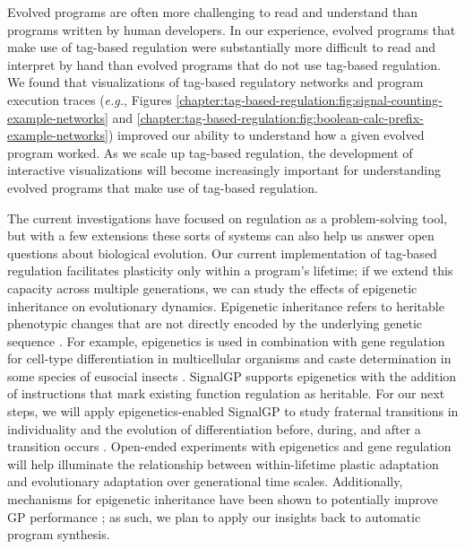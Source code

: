 Evolved programs are often more challenging to read and understand than programs written by human developers.
In our experience, evolved programs that make use of tag-based regulation were substantially more difficult to read and interpret by hand than evolved programs that do not use tag-based regulation.
We found that visualizations of tag-based regulatory networks and program execution traces (\textit{e.g.}, Figures \ref{chapter:tag-based-regulation:fig:signal-counting-example-networks} and \ref{chapter:tag-based-regulation:fig:boolean-calc-prefix-example-networks}) improved our ability to understand how a given evolved program worked.
As we scale up tag-based regulation, the development of interactive visualizations will become increasingly important for understanding evolved programs that make use of tag-based regulation.  

The current investigations have focused on regulation as a problem-solving tool, but with a few extensions these sorts of systems can also help us answer open questions about biological evolution.
Our current implementation of tag-based regulation facilitates plasticity only within a program's lifetime; if we extend this capacity across multiple generations, we can study the effects of epigenetic inheritance on evolutionary dynamics.
Epigenetic inheritance refers to heritable phenotypic changes that are not directly encoded by the underlying genetic sequence \citep{bender_plant_2002,jablonka_transgenerational_2009}.
For example, epigenetics is used in combination with gene regulation for cell-type differentiation in multicellular organisms \citep{mohn_genetics_2009, smith_dna_2013} and caste determination in some species of eusocial insects \citep{weiner_epigenetics_2012}.
SignalGP supports epigenetics with the addition of instructions that mark existing function regulation as heritable.
For our next steps, we will apply epigenetics-enabled SignalGP to study fraternal transitions in individuality and the evolution of differentiation before, during, and after a transition occurs \citep{Lalejini_Moreno_Ofria_DISHTINY_2020}.
Open-ended experiments with epigenetics and gene regulation will help illuminate the relationship between within-lifetime plastic adaptation and evolutionary adaptation over generational time scales.
Additionally, mechanisms for epigenetic inheritance have been shown to potentially improve GP performance \citep{la_cava_genetic_2015, la_cava_inheritable_2015,ricalde_evolving_2017}; as such, we plan to apply our insights back to automatic program synthesis. 